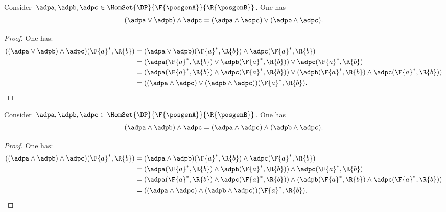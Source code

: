{\begin{lemma}
    \label{lem:wedge_vee}
    Consider~$\adpa,\adpb,\adpc\in \HomSet{\DP}{\F{\posgenA}}{\R{\posgenB}}$. One has
    \begin{equation*}
        (\adpa \vee \adpb)\wedge \adpc=(\adpa \wedge \adpc) \vee (\adpb\wedge \adpc).
    \end{equation*}
\end{lemma}
\begin{proof}
    One has:
    \begin{equation*}
        \begin{aligned}
            ((\adpa \vee \adpb)\wedge \adpc)(\F{a}^*,\R{b})&=
            (\adpa \vee \adpb)(\F{a}^*,\R{b})\wedge \adpc(\F{a}^*,\R{b})\\
            &=(\adpa(\F{a}^*,\R{b}) \vee \adpb(\F{a}^*,\R{b}))\vee \adpc(\F{a}^*,\R{b})\\
            &=(\adpa(\F{a}^*,\R{b}) \wedge  \adpc(\F{a}^*,\R{b})) \vee (\adpb(\F{a}^*,\R{b})\wedge \adpc(\F{a}^*,\R{b}))\\
            &=((\adpa \wedge \adpc) \vee (\adpb\wedge \adpc))(\F{a}^*,\R{b}).
        \end{aligned}
    \end{equation*}
\end{proof}

\begin{lemma}
    \label{lem:wedge_wedge}
    Consider~$\adpa,\adpb,\adpc\in \HomSet{\DP}{\F{\posgenA}}{\R{\posgenB}}$. One has
    \begin{equation*}
        (\adpa \wedge \adpb)\wedge \adpc=(\adpa \wedge \adpc) \wedge (\adpb\wedge \adpc).
    \end{equation*}
\end{lemma}
\begin{proof}
    One has:
    \begin{equation*}
        \begin{aligned}
            ((\adpa \wedge \adpb)\wedge \adpc)(\F{a}^*,\R{b})&=
            (\adpa \wedge \adpb)(\F{a}^*,\R{b})\wedge \adpc(\F{a}^*,\R{b})\\
            &=(\adpa(\F{a}^*,\R{b}) \wedge \adpb(\F{a}^*,\R{b}))\wedge \adpc(\F{a}^*,\R{b})\\
            &=(\adpa(\F{a}^*,\R{b}) \wedge  \adpc(\F{a}^*,\R{b})) \wedge (\adpb(\F{a}^*,\R{b})\wedge \adpc(\F{a}^*,\R{b}))\\
            &=((\adpa \wedge \adpc) \wedge (\adpb\wedge \adpc))(\F{a}^*,\R{b}).
        \end{aligned}
    \end{equation*}
\end{proof}




}

